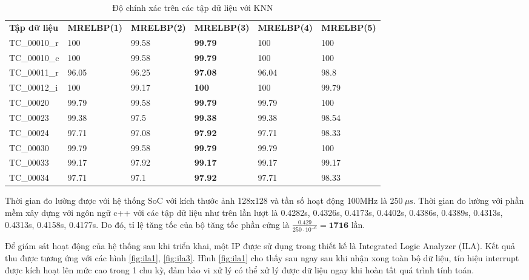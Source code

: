 \begin{table}[!ht]
	\centering
	\renewcommand{\arraystretch}{1.3}
	\caption{Độ chính xác trên các tập dữ liệu với KNN}
	\begin{tabular}{|p{2.5cm} p{2.5cm} p{2.5cm} p{2.5cm} p{2.5cm} p{2.5cm}|}
		\hline
		\rowcolor{gray!30}
		\textbf{Tập dữ liệu} & \textbf{MRELBP(1)}  & \textbf{MRELBP(2)} & \textbf{MRELBP(3) } &  \textbf{MRELBP(4)} & \textbf{MRELBP(5)}  \\
		TC\_00010\_r & 100 & 99.58& \textbf{99.79} & 100 & 100
		\\ \hline
		TC\_00010\_c & 100 & 99.58 & \textbf{99.79} & 100 & 100
		\\ \hline
		TC\_00011\_r & 96.05 &96.25 & \textbf{97.08} & 96.04 & 98.8
		\\ \hline
		TC\_00012\_i & 100 & 99.17 & \textbf{100} & 100 & 99.79
		\\ \hline
		TC\_00020 & 99.79 & 99.58 & \textbf{99.79} & 99.79 & 100
		\\ \hline
		TC\_00023 & 99.38 & 97.5 & \textbf{99.38} & 99.38 & 98.54
		\\ \hline
		TC\_00024 & 97.71 & 97.08 & \textbf{97.92} & 97.71 & 98.33
		\\ \hline                   
		TC\_00030 & 99.79 & 99.58 & \textbf{99.79} & 99.79 & 100
		\\ \hline
		TC\_00033 & 99.17 & 97.92 & \textbf{99.17} & 99.17 & 99.17
		\\ \hline
		TC\_00034 & 97.71 & 97.1 & \textbf{97.92} & 97.71 & 98.33
		\\ \hline
	\end{tabular}
	
	\label{tab:knn}
\end{table}


Thời gian đo lường được với hệ thống SoC với kích thước ảnh 128x128 và tần số hoạt động 100MHz là 250$~\mu\text{s}$. Thời gian đo lường với phần mềm xây dựng với ngôn ngữ c++ với các tập dữ liệu như trên lần lượt là 0.4282s, 0.4326s, 0.4173s, 0.4402s, 0.4386s, 0.4389s, 0.4313s, 0.4313s, 0.4158s, 0.4177s. Do đó, tỉ lệ tăng tốc của bộ tăng tốc phần cứng là $\frac{0.429}{250\cdot10^{-6}}=\textbf{1716}$ lần.

Để giám sát hoạt động của hệ thống sau khi triển khai, một IP được sử dụng trong thiết kế là Integrated Logic Analyzer (ILA). Kết quả thu được tương ứng với các hình \ref{fig:ila1}, \ref{fig:ila3}. Hình \ref{fig:ila1} cho thấy sau ngay sau khi nhận xong toàn bộ dữ liệu, tín hiệu interrupt được kích hoạt lên mức cao trong 1 chu kỳ, đảm bảo vi xử lý có thể xử lý được dữ liệu ngay khi hoàn tất quá trình tính toán.

